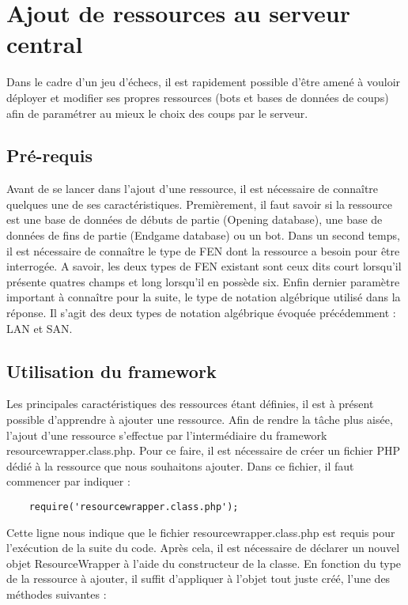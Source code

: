 \documentclass[a4paper,11pt]{article}
\begin{document}
\section{Ajout de ressources au serveur central}
Dans le cadre d'un jeu d'échecs, il est rapidement possible d'être amené à vouloir déployer et modifier ses propres ressources (bots et bases de données de coups) afin de paramétrer au mieux le choix des coups par le serveur.
        

\subsection{Pré-requis}
Avant de se lancer dans l'ajout d'une ressource, il est nécessaire de connaître quelques une de ses caractéristiques.
Premièrement, il faut savoir si la ressource est une base de données de débuts de partie (Opening database), une base de données de fins de partie (Endgame database) ou un bot.
Dans un second temps, il est nécessaire de connaître le type de FEN dont la ressource a besoin pour être interrogée.
A savoir, les deux types de FEN existant sont ceux dits court lorsqu'il présente quatres champs et long lorsqu'il en possède six.
Enfin dernier paramètre important à connaître pour la suite, le type de notation algébrique utilisé dans la réponse.
Il s'agit des deux types de notation algébrique évoquée précédemment : LAN et SAN.
	
     
\subsection{Utilisation du framework}
Les principales caractéristiques des ressources étant définies, il est à présent possible d'apprendre à ajouter une ressource.
Afin de rendre la tâche plus aisée, l'ajout d'une ressource s'effectue par l'intermédiaire du framework resourcewrapper.class.php.
Pour ce faire, il est nécessaire de créer un fichier PHP dédié à la ressource que nous souhaitons ajouter.
Dans ce fichier, il faut commencer par indiquer : 
	\begin{lstlisting}
	require('resourcewrapper.class.php');
	\end{lstlisting} 
	Cette ligne nous indique que le fichier resourcewrapper.class.php est requis pour l'exécution de la suite du code. Après cela, il est nécessaire de déclarer un nouvel objet ResourceWrapper à l'aide du constructeur de la classe. En fonction du type de la ressource à ajouter, il suffit d'appliquer à l'objet tout juste créé, l'une des méthodes suivantes :
\end{document}
